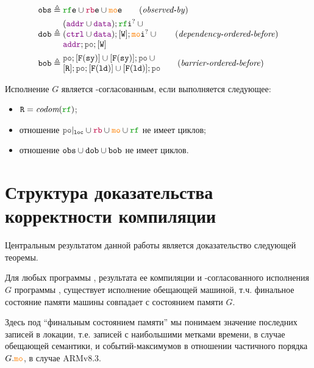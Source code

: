 \begin{align*}
\lOBS &\defeq  \lRFE \cup \lFRE \cup \lCOE  \tag{\emph{observed-by}} \\
\lDOB &\defeq \inarr{(\lADDR \cup \lDATA); \lRFI^? \cup {} \\
	(\lCTRL \cup \lDATA); [\lW]; \lCOI^? \cup {} \\
	\lADDR; \lPO; [\lW]} \tag{\emph{dependency-ordered-before}} \\
\lBOB &\defeq \inarr{\lPO; [\lDMBSY] \cup [\lDMBSY]; \lPO  \cup {} \\
                    {} [\lR]; \lPO; [\lDMBLD] \cup [\lDMBLD]; \lPO} \tag{\emph{barrier-ordered-before}}
\end{align*}

\begin{definition}
Исполнение $G$ является \ARM-согласованным, если выполняется следующее:
\begin{itemize}
\item $\lR = \codom{\lRF}$; 
\item отношение $\lPO\rst{\lLOC} \cup \lFR \cup \lCO \cup \lRF$ не имеет циклов; 
\item отношение ${\mathtt{obs}} \cup {\mathtt{dob}} \cup {\mathtt{bob}}$ не имеет циклов. 
\end{itemize}
\end{definition}


\section{Структура доказательства корректности компиляции}
\label{sec:highlevel}
Центральным результатом данной работы является доказательство следующей теоремы.
\begin{theorem}
  \label{prop:compile-theorem}
  Для любых программы \Prog, результата ее компиляции \ProgARM и \ARM-согласованного исполнения $G$ программы
  \ProgARM, существует исполнение \Prog обещающей машиной, т.ч. 
  финальное состояние памяти машины совпадает с состоянием памяти $G$.
\end{theorem}
\noindent
Здесь под ``финальным состоянием памяти'' мы понимаем значение последних записей в локации, т.е. записей с наибольшими
метками времени, в случае обещающей семантики, и событий-максимумов в отношении частичного порядка $G.\lCO$, в случае ARMv8.3.

